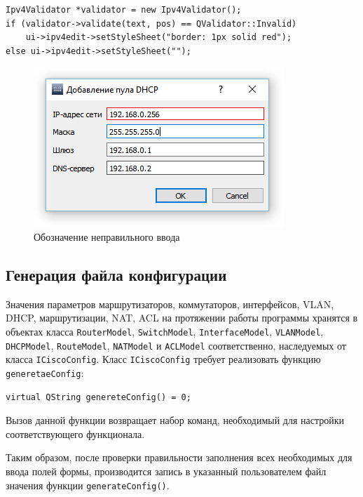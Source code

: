 \begin{lstlisting}[label=lst:ipvalid,caption=Валидация IP-адреса]
Ipv4Validator *validator = new Ipv4Validator();
if (validator->validate(text, pos) == QValidator::Invalid)
	ui->ipv4edit->setStyleSheet("border: 1px solid red");
else ui->ipv4edit->setStyleSheet("");
\end{lstlisting}

\begin{figure}[th!]
\centering
\includegraphics[width=0.8\linewidth]{pic/ipvalid}
\caption{Обозначение неправильного ввода}
\label{fig:ipvalid}
\end{figure}



\subsection{Генерация файла конфигурации}

Значения параметров маршрутизаторов, коммутаторов, интерфейсов, VLAN, DHCP, маршрутизации, NAT, ACL на протяжении работы программы хранятся в объектах класса \texttt{RouterModel}, \texttt{SwitchModel}, \texttt{InterfaceModel}, \texttt{VLANModel}, \texttt{DHCPModel}, \texttt{RouteModel}, \texttt{NATModel} и \texttt{ACLModel} соответственно, наследуемых от класса \texttt{ICiscoConfig}. Класс \texttt{ICiscoConfig} требует реализовать функцию \texttt{generetaeConfig}:

\begin{lstlisting}
virtual QString genereteConfig() = 0;
\end{lstlisting}

Вызов данной функции возвращает набор команд, необходимый для настройки соответствующего функционала.

Таким образом, после проверки правильности заполнения всех необходимых для ввода полей формы, производится запись в указанный пользователем файл значения функции \texttt{generateConfig()}.


